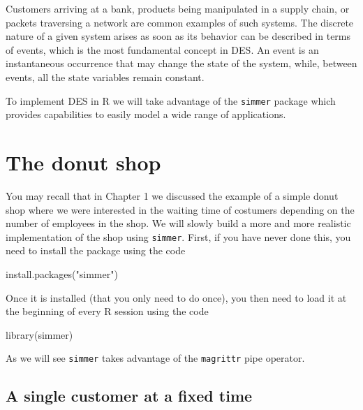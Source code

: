 \documentclass[
]{book}
\newenvironment{Shaded}{\begin{snugshade}}{\end{snugshade}}
\newcommand{\FunctionTok}[1]{\textcolor[rgb]{0.00,0.00,0.00}{#1}}
\newcommand{\NormalTok}[1]{#1}
\newcommand{\StringTok}[1]{\textcolor[rgb]{0.31,0.60,0.02}{#1}}
\begin{document}
Customers arriving at a bank, products being manipulated in a supply chain, or packets traversing a network are common examples of such systems. The discrete nature of a given system arises as soon as its behavior can be described in terms of events, which is the most fundamental concept in DES. An event is an instantaneous occurrence that may change the state of the system, while, between events, all the state variables remain constant.

To implement DES in R we will take advantage of the \texttt{simmer} package which provides capabilities to easily model a wide range of applications.

\hypertarget{the-donut-shop}{%
\section{The donut shop}\label{the-donut-shop}}

You may recall that in Chapter 1 we discussed the example of a simple donut shop where we were interested in the waiting time of costumers depending on the number of employees in the shop. We will slowly build a more and more realistic implementation of the shop using \texttt{simmer}. First, if you have never done this, you need to install the package using the code

\begin{Shaded}
\begin{Highlighting}[]
\FunctionTok{install.packages}\NormalTok{(}\StringTok{"simmer"}\NormalTok{)}
\end{Highlighting}
\end{Shaded}

Once it is installed (that you only need to do once), you then need to load it at the beginning of every R session using the code

\begin{Shaded}
\begin{Highlighting}[]
\FunctionTok{library}\NormalTok{(simmer)}
\end{Highlighting}
\end{Shaded}

As we will see \texttt{simmer} takes advantage of the \texttt{magrittr} pipe operator.

\hypertarget{a-single-customer-at-a-fixed-time}{%
\subsection{A single customer at a fixed time}\label{a-single-customer-at-a-fixed-time}}
\end{document}
